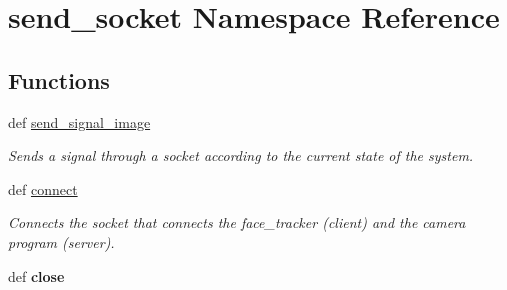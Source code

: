 \hypertarget{namespacesend__socket}{\section{send\-\_\-socket Namespace Reference}
\label{namespacesend__socket}
}
\subsection*{Functions}
\begin{DoxyCompactItemize}
\item 
def \hyperlink{namespacesend__socket_a260ad511d2d46bb01685c87b34d222b0}{send\-\_\-signal\-\_\-image}
\begin{DoxyCompactList}\small\item\em Sends a signal through a socket according to the current state of the system. \end{DoxyCompactList}\item 
\hypertarget{namespacesend__socket_a4cfa64d54aeca3b78b3318dcbe1c2fec}{def \hyperlink{namespacesend__socket_a4cfa64d54aeca3b78b3318dcbe1c2fec}{connect}}\label{namespacesend__socket_a4cfa64d54aeca3b78b3318dcbe1c2fec}

\begin{DoxyCompactList}\small\item\em Connects the socket that connects the face\-\_\-tracker (client) and the camera program (server). \end{DoxyCompactList}\item 
\hypertarget{namespacesend__socket_a0f7b7104845a17d007a666c1af343765}{def {\bfseries close}}\label{namespacesend__socket_a0f7b7104845a17d007a666c1af343765}


\end{DoxyCompactItemize}
